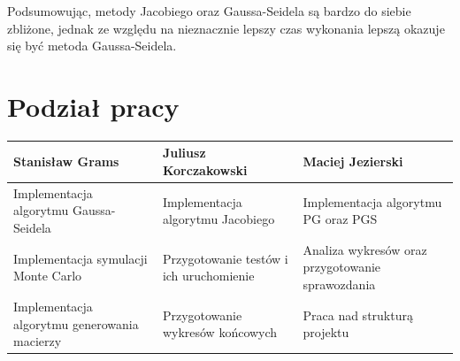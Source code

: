 \documentclass[10pt]{article}
\begin{document}
Podsumowując, metody Jacobiego oraz Gaussa-Seidela są bardzo do siebie zbliżone, jednak ze względu na nieznacznie lepszy czas wykonania lepszą okazuje się być metoda Gaussa-Seidela.

\section{Podział pracy}
\centering
	\begin{tabular}{| p{5cm} | p{5cm} | p{5cm} |}
		\hline
		\textbf{Stanisław Grams} & \textbf{Juliusz Korczakowski} & \textbf{Maciej Jezierski} \\ \hline
		Implementacja algorytmu Gaussa-Seidela & Implementacja algorytmu Jacobiego & Implementacja algorytmu PG oraz PGS  \\ \hline
		Implementacja symulacji Monte Carlo & Przygotowanie testów i ich uruchomienie & Analiza wykresów oraz przygotowanie sprawozdania \\ \hline
		Implementacja algorytmu generowania macierzy & Przygotowanie wykresów końcowych & Praca nad strukturą projektu\\ \hline
	\end{tabular}
\
\end{document}
